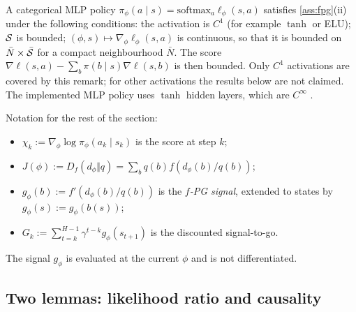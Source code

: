 \begin{remark}\label{rem:fpg-mlp}
A categorical MLP policy $\pi_\phi(a\mid s)=\mathrm{softmax}_a\ell_\phi(s,a)$ satisfies \cref{ass:fpg}(ii) under the following conditions:
the activation is $C^1$ (for example $\tanh$ or ELU);
$\mathcal{S}$ is bounded;
$(\phi,s)\mapsto\nabla_\phi\ell_\phi(s,a)$ is continuous, so that it is bounded on $\bar N\times\bar{\mathcal{S}}$ for a compact neighbourhood $\bar N$.
The score $\nabla\ell(s,a)-\sum_b\pi(b\mid s)\nabla\ell(s,b)$ is then bounded.
Only $C^1$ activations are covered by this remark; for other activations the results below are not claimed.
The implemented MLP policy uses $\tanh$ hidden layers, which are $C^\infty$ .
\end{remark}

Notation for the rest of the section:
\begin{itemize}[nosep]
\item $\chi_k:=\nabla_\phi\log\pi_\phi(a_k\mid s_k)$ is the score at step $k$;
\item $J(\phi):=D_f(d_\phi\Vert q)=\sum_bq(b)f(d_\phi(b)/q(b))$;
\item $g_\phi(b):=f'(d_\phi(b)/q(b))$ is the \emph{$f$-PG signal}, extended to states by $g_\phi(s):=g_\phi(b(s))$;
\item $G_k:=\sum_{t=k}^{H-1}\gamma^{t-k}g_\phi(s_{t+1})$ is the discounted signal-to-go.
\end{itemize}
The signal $g_\phi$ is evaluated at the current $\phi$ and is not differentiated.

\subsection{Two lemmas: likelihood ratio and causality}

